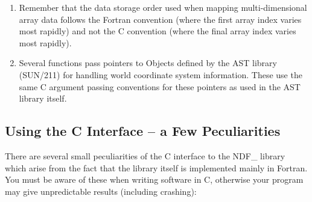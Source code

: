 \documentclass[twoside,11pt]{article}
\newcommand{\xref}[3]{#1}
\newcommand{\xlabel}[1]{}
\begin{document}
\begin{enumerate}
\item Remember that the data storage order used when mapping
multi-dimensional array data follows the Fortran convention (where the
first array index varies most rapidly) and not the C convention (where
the final array index varies most rapidly).

\item Several functions pass pointers to Objects defined by the AST
library (\xref{SUN/211}{sun211}{}) for handling world coordinate
system information. These use the same C argument passing conventions
for these pointers as used in the AST library itself.
\end{enumerate}

\subsection{\xlabel{using_the_c_interface_a_few_peculiarities}Using the C Interface -- a Few Peculiarities}

There are several small peculiarities of the C interface to the NDF\_
library which arise from the fact that the library itself is
implemented mainly in Fortran. You must be aware of these when writing
software in C, otherwise your program may give unpredictable results
(including crashing):
\end{document}
